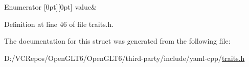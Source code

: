 \begin{DoxyEnumFields}{Enumerator}
[0pt][0pt]{}\mbox{\label{struct_y_a_m_l_1_1is__numeric_3_01unsigned_01short_01int_01_4_aecf52ce16e6fde0ccebd9cef00564d0ba09893573c934811659700af3e45e4dc0}} 
value&\\
\hline

\end{DoxyEnumFields}


Definition at line 46 of file traits.\+h.



The documentation for this struct was generated from the following file\+:\begin{DoxyCompactItemize}
\item 
D\+:/\+V\+C\+Repos/\+Open\+G\+L\+T6/\+Open\+G\+L\+T6/third-\/party/include/yaml-\/cpp/\mbox{\hyperlink{traits_8h}{traits.\+h}}\end{DoxyCompactItemize}
